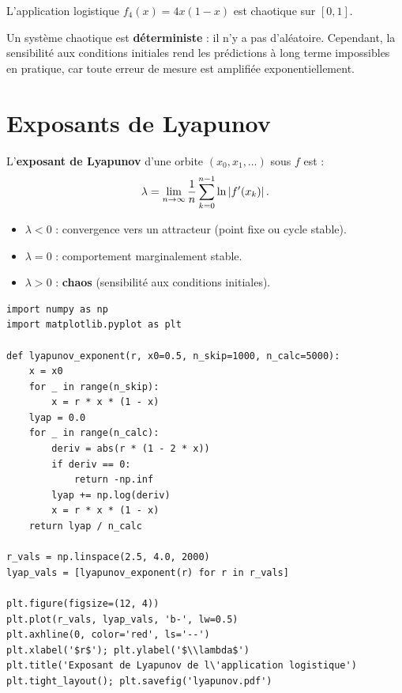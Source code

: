 \begin{theoreme}
L'application logistique $f_4(x)=4x(1-x)$ est chaotique sur $[0,1]$.
\end{theoreme}

\begin{intuition}[title=\textbf{Chaos et pr\'evisibilit\'e}]
Un syst\`eme chaotique est \textbf{d\'eterministe} : il n'y a pas
d'al\'eatoire.  Cependant, la sensibilit\'e aux conditions initiales
rend les pr\'edictions \`a long terme impossibles en pratique, car
toute erreur de mesure est amplifi\'ee exponentiellement.
\end{intuition}

\section{Exposants de Lyapunov}
\label{sec:lyapunov}

\begin{definition}
L'\textbf{exposant de Lyapunov} d'une orbite $(x_0,x_1,\ldots)$
sous $f$ est :
\[
  \lambda = \lim_{n\to\infty}\frac{1}{n}\sum_{k=0}^{n-1}
  \ln\left| f'(x_k) \right|.
\]
\begin{itemize}
  \item $\lambda < 0$ : convergence vers un attracteur (point fixe
    ou cycle stable).
  \item $\lambda = 0$ : comportement marginalement stable.
  \item $\lambda > 0$ : \textbf{chaos} (sensibilit\'e aux conditions
    initiales).
\end{itemize}
\end{definition}

\begin{codeblock}[title=\textbf{Calcul de l'exposant de Lyapunov}]
\begin{verbatim}
import numpy as np
import matplotlib.pyplot as plt

def lyapunov_exponent(r, x0=0.5, n_skip=1000, n_calc=5000):
    x = x0
    for _ in range(n_skip):
        x = r * x * (1 - x)
    lyap = 0.0
    for _ in range(n_calc):
        deriv = abs(r * (1 - 2 * x))
        if deriv == 0:
            return -np.inf
        lyap += np.log(deriv)
        x = r * x * (1 - x)
    return lyap / n_calc

r_vals = np.linspace(2.5, 4.0, 2000)
lyap_vals = [lyapunov_exponent(r) for r in r_vals]

plt.figure(figsize=(12, 4))
plt.plot(r_vals, lyap_vals, 'b-', lw=0.5)
plt.axhline(0, color='red', ls='--')
plt.xlabel('$r$'); plt.ylabel('$\\lambda$')
plt.title('Exposant de Lyapunov de l\'application logistique')
plt.tight_layout(); plt.savefig('lyapunov.pdf')
\end{verbatim}
\end{codeblock}


